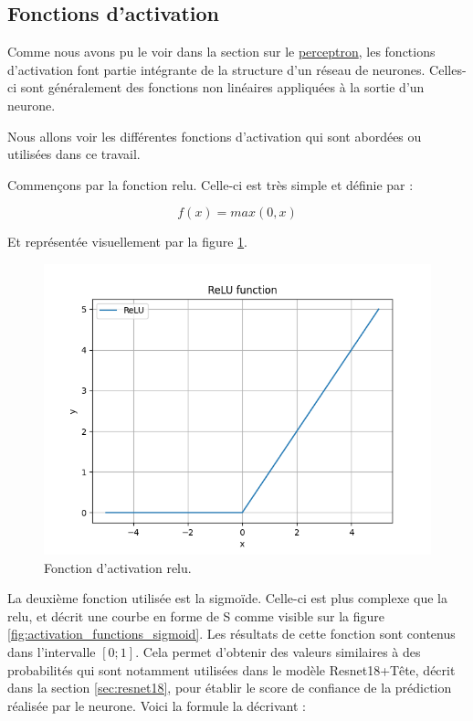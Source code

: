 \subsection{Fonctions d'activation}
\label{sec:fa}

Comme nous avons pu le voir dans la section sur le \hyperref[sec:perceptron]{perceptron}, les fonctions d'activation font partie intégrante de la structure d'un réseau de neurones. Celles-ci sont généralement des fonctions non linéaires appliquées à la sortie d'un neurone.

Nous allons voir les différentes fonctions d'activation qui sont abordées ou utilisées dans ce travail.

Commençons par la fonction \acrfull{relu}. Celle-ci est très simple et définie par :

\[f(x)=max(0,x)\]

Et représentée visuellement par la figure \ref{fig:activation_functions_relu}.

\begin{figure}[hbt!]
    \centering
    \includegraphics[scale=0.6]{Figures/activation_functions/relu.png}
    \caption{Fonction d'activation \acrshort{relu}.}
    \label{fig:activation_functions_relu}
\end{figure}

La deuxième fonction utilisée est la sigmoïde. Celle-ci est plus complexe que la \acrshort{relu}, et décrit une courbe en forme de S comme visible sur la figure \ref{fig:activation_functions_sigmoid}. Les résultats de cette fonction sont contenus dans l'intervalle $[0;1]$. Cela permet d'obtenir des valeurs similaires à des probabilités qui sont notamment utilisées dans le modèle Resnet18+Tête, décrit dans la section \ref{sec:resnet18}, pour établir le score de confiance de la prédiction réalisée par le neurone. Voici la formule la décrivant :

